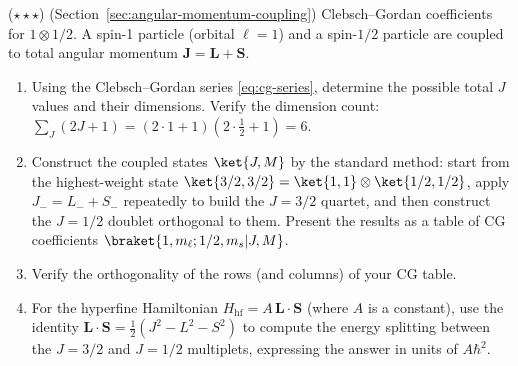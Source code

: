 \begin{problemset}
\item ($\star\star\star$) (Section~\ref{sec:angular-momentum-coupling}) Clebsch--Gordan coefficients for $1\otimes 1/2$. A spin-1 particle (orbital $\ell=1$) and a spin-$1/2$ particle are coupled to total angular momentum $\bm J = \bm L + \bm S$.
\begin{enumerate}
\item[(a)] Using the Clebsch--Gordan series \eqref{eq:cg-series}, determine the possible total $J$ values and their dimensions. Verify the dimension count: $\sum_J (2J+1) = (2\cdot1+1)(2\cdot\frac12+1) = 6$.
\item[(b)] Construct the coupled states $\ket{J,M}$ by the standard method: start from the highest-weight state $\ket{3/2,3/2} = \ket{1,1}\otimes\ket{1/2,1/2}$, apply $J_- = L_- + S_-$ repeatedly to build the $J=3/2$ quartet, and then construct the $J=1/2$ doublet orthogonal to them. Present the results as a table of CG coefficients $\braket{1,m_\ell;1/2,m_s|J,M}$.
\item[(c)] Verify the orthogonality of the rows (and columns) of your CG table.
\item[(d)] For the hyperfine Hamiltonian $H_{\text{hf}} = A\,\bm L\cdot\bm S$ (where $A$ is a constant), use the identity $\bm L\cdot\bm S = \frac12(J^2 - L^2 - S^2)$ to compute the energy splitting between the $J=3/2$ and $J=1/2$ multiplets, expressing the answer in units of $A\hbar^2$.
\end{enumerate}


\end{problemset}
